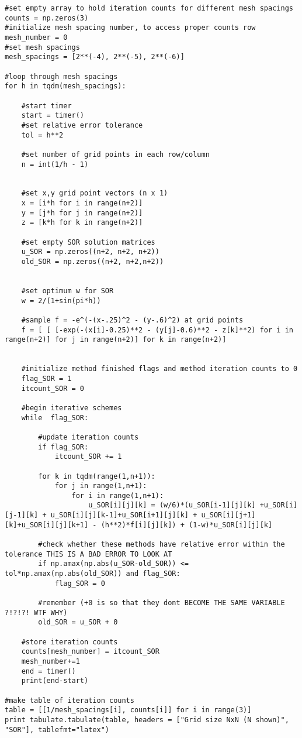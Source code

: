 \documentclass[12pt]{article}
\begin{document}
\begin{verbatim}
#set empty array to hold iteration counts for different mesh spacings
counts = np.zeros(3)
#initialize mesh spacing number, to access proper counts row
mesh_number = 0
#set mesh spacings
mesh_spacings = [2**(-4), 2**(-5), 2**(-6)]

#loop through mesh spacings
for h in tqdm(mesh_spacings):

	#start timer
	start = timer()
	#set relative error tolerance
	tol = h**2

	#set number of grid points in each row/column
	n = int(1/h - 1)

	
	#set x,y grid point vectors (n x 1)
	x = [i*h for i in range(n+2)]
	y = [j*h for j in range(n+2)]
	z = [k*h for k in range(n+2)]
	
	#set empty SOR solution matrices
	u_SOR = np.zeros((n+2, n+2, n+2))
	old_SOR = np.zeros((n+2, n+2,n+2))


	#set optimum w for SOR
	w = 2/(1+sin(pi*h))

	#sample f = -e^(-(x-.25)^2 - (y-.6)^2) at grid points
	f = [ [ [-exp(-(x[i]-0.25)**2 - (y[j]-0.6)**2 - z[k]**2) for i in range(n+2)] for j in range(n+2)] for k in range(n+2)]
	

	#initialize method finished flags and method iteration counts to 0
	flag_SOR = 1
	itcount_SOR = 0

	#begin iterative schemes
	while  flag_SOR:

		#update iteration counts
		if flag_SOR:
			itcount_SOR += 1

		for k in tqdm(range(1,n+1)):
			for j in range(1,n+1):
				for i in range(1,n+1):
					u_SOR[i][j][k] = (w/6)*(u_SOR[i-1][j][k] +u_SOR[i][j-1][k] + u_SOR[i][j][k-1]+u_SOR[i+1][j][k] + u_SOR[i][j+1][k]+u_SOR[i][j][k+1] - (h**2)*f[i][j][k]) + (1-w)*u_SOR[i][j][k]

		#check whether these methods have relative error within the tolerance THIS IS A BAD ERROR TO LOOK AT	
		if np.amax(np.abs(u_SOR-old_SOR)) <= tol*np.amax(np.abs(old_SOR)) and flag_SOR:
			flag_SOR = 0

		#remember (+0 is so that they dont BECOME THE SAME VARIABLE ?!?!?! WTF WHY)
		old_SOR = u_SOR + 0

	#store iteration counts
	counts[mesh_number] = itcount_SOR
	mesh_number+=1
	end = timer()
	print(end-start)

#make table of iteration counts
table = [[1/mesh_spacings[i], counts[i]] for i in range(3)]
print tabulate.tabulate(table, headers = ["Grid size NxN (N shown)", "SOR"], tablefmt="latex")

\end{verbatim}
\end{document}
